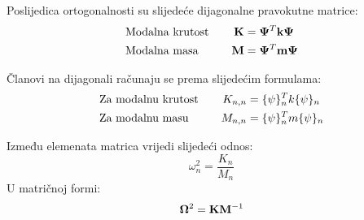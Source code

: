 Poslijedica ortogonalnosti su slijedeće dijagonalne pravokutne matrice:
\begin{alignat}{2}
    &\text{Modalna krutost}\quad & \mathbf{K}&=\mathbf{\Psi}^T\mathbf{k}\mathbf{\Psi}\label{eq:modalna_krutost_matrica}\\
    &\text{Modalna masa}\quad &\mathbf{M}&=\mathbf{\Psi}^T\mathbf{m}\mathbf{\Psi}\label{eq:modalna_masa_matrica}
\end{alignat}

Članovi na dijagonali računaju se prema slijedećim formulama:
\begin{alignat}{2}
    &\text{Za modalnu krutost}\quad & K_{n,n}&=\vtor{\psi}{}_n^Tk\vtor{\psi}{}_n\label{eq:modalna_krutost}\\
    &\text{Za modalnu masu}\quad &M_{n,n}&=\vtor{\psi}{}_n^Tm\vtor{\psi}{}_n\label{eq:modalna_masa}
\end{alignat}

Između elemenata matrica vrijedi slijedeći odnos:
\begin{equation}
    \omega_n^2=\frac{K_n}{M_n}
\end{equation}
U matričnoj formi:
\begin{equation}
    \mathbf{\Omega}^2=\mathbf{K}\mathbf{M}^{-1}
\end{equation}

